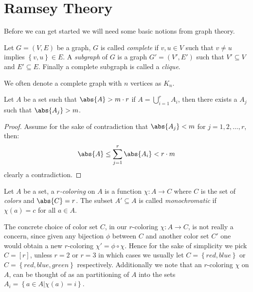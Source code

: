 \chapter{Ramsey Theory}

Before we can get started we will need some basic notions from graph theory.
\begin{definition}
	Let $G = (V, E)$ be a graph, $G$ is called \textit{complete} if $v, u \in V$ such that $v \neq u$ implies $\left\{v, u\right\} \in E$. A \textit{subgraph} of $G$ is a graph $G' = (V', E')$ such that $V' \subseteq V$ and $E' \subseteq E$. Finally a complete subgraph is called a \textit{clique}.
\end{definition}
We often denote a complete graph with $n$ vertices as $K_n$.


\begin{theorem}\label{thm:gpp}
	Let $A$ be a set such that $\abs{A} > m \cdot r$ if $A = \bigcup_{i = 1}^{r} A_i$, then there exists a $A_j$ such that $\abs{A_j} > m$.
\end{theorem}
\begin{proof}
	Assume for the sake of contradiction that $\abs{A_j} < m$ for $j = 1, 2, \ldots, r$, then:
	\begin{equation*}
		\abs{A} \leq \sum_{j = 1}^r \abs{A_i} < r \cdot m
	\end{equation*}
	clearly a contradiction.
\end{proof}

\begin{definition}
	Let $A$ be a set, a \textit{$r$-coloring} on $A$ is a function $\chi: A \to C$ where $C$ is the set of \textit{colors} and $\abs{C} = r$. The subset $A' \subseteq A$ is called \textit{monochromatic} if $\chi(a) = c$ for all $a \in A$.
\end{definition}
\begin{remark}
	The concrete choice of color set $C$, in our $r$-coloring $\chi: A \to C$, is not really a concern, since given any bijection $\phi$ between $C$ and another color set $C'$ one would obtain a new $r$-coloring $\chi' = \phi \circ \chi$.
	Hence for the sake of simplicity we pick $C = [r]$, unless $r = 2$ or $r = 3$ in which cases we usually let $C = \left\{red, blue\right\}$ or $C = \left\{red, blue, green\right\}$ respectively. Additionally we note that an $r$-coloring $\chi$ on $A$, can be thought of as an partitioning of $A$ into the sets $A_i = \left\{a \in A | \chi(a) = i\right\}$.
\end{remark}

